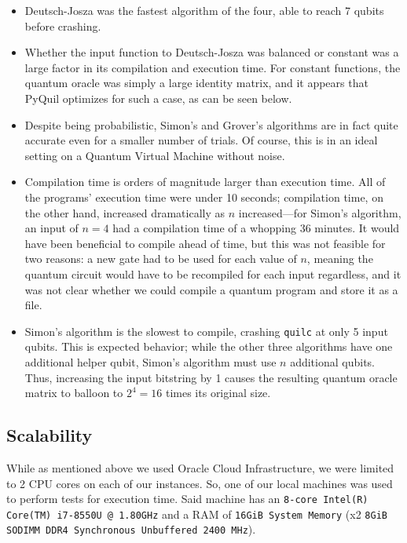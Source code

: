 \documentclass[12pt]{article}
\begin{document}
\begin{itemize}
    \item Deutsch-Josza was the fastest algorithm of the four, able to reach 7 qubits before crashing.
    \item Whether the input function to Deutsch-Josza was balanced or constant was a large factor in its compilation and execution time. For constant functions, the quantum oracle was simply a large identity matrix, and it appears that PyQuil optimizes for such a case, as can be seen below.
    \item Despite being probabilistic, Simon's and Grover's algorithms are in fact quite accurate even for a smaller number of trials. Of course, this is in an ideal setting on a Quantum Virtual Machine without noise.
    \item Compilation time is orders of magnitude larger than execution time. All of the programs' execution time were under 10 seconds; compilation time, on the other hand, increased dramatically as $n$ increased---for Simon's algorithm, an input of $n=4$ had a compilation time of a whopping 36 minutes. It would have been beneficial to compile ahead of time, but this was not feasible for two reasons: a new gate had to be used for each value of $n$, meaning the quantum circuit would have to be recompiled for each input regardless, and it was not clear whether we could compile a quantum program and store it as a file.
    \item Simon's algorithm is the slowest to compile, crashing \texttt{quilc} at only 5 input qubits. This is expected behavior; while the other three algorithms have one additional helper qubit, Simon's algorithm must use $n$ additional qubits. Thus, increasing the input bitstring by 1 causes the resulting quantum oracle matrix to balloon to $2^4 = 16$ times its original size.
\end{itemize}

\subsection{Scalability}\label{section:scale}

While as mentioned above we used Oracle Cloud Infrastructure, we were limited to 2 CPU cores on each of our instances.
So, one of our local machines was used to perform tests for execution time.
Said machine has an \texttt{8-core Intel(R) Core(TM) i7-8550U @ 1.80GHz} and a RAM of \texttt{16GiB System Memory} (x2 \texttt{8GiB SODIMM DDR4 Synchronous Unbuffered 2400 MHz}).
\end{document}

